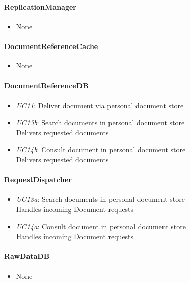 \documentclass[a4paper,10pt]{article}
\begin{document}
\paragraph{ReplicationManager}
\begin{itemize}
	\item None
\end{itemize}

\paragraph{DocumentReferenceCache}
\begin{itemize}
	\item None
\end{itemize}

\paragraph{DocumentReferenceDB}
\begin{itemize}
	\item \emph{UC11}: Deliver document via personal document store
	\item \emph{UC13b}: Search documents in personal document store\\ Delivers requested documents
	\item \emph{UC14b}: Consult document in personal document store\\ Delivers requested documents
\end{itemize}

\paragraph{RequestDispatcher}
\begin{itemize}
	\item \emph{UC13a}: Search documents in personal document store\\ Handles incoming Document requests
	\item \emph{UC14a}: Consult document in personal document store\\ Handles incoming Document requests
\end{itemize}

\paragraph{RawDataDB}
\begin{itemize}
	\item None
\end{itemize}
\end{document}
